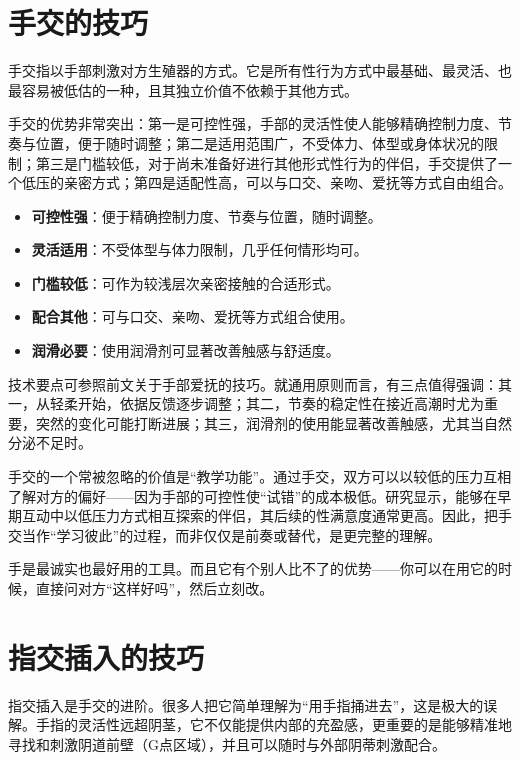 \documentclass[12pt,UTF8]{ctexbook}
\begin{document}
\section{手交的技巧}

手交指以手部刺激对方生殖器的方式。它是所有性行为方式中最基础、最灵活、也最容易被低估的一种，且其独立价值不依赖于其他方式。

手交的优势非常突出：第一是可控性强，手部的灵活性使人能够精确控制力度、节奏与位置，便于随时调整；第二是适用范围广，不受体力、体型或身体状况的限制；第三是门槛较低，对于尚未准备好进行其他形式性行为的伴侣，手交提供了一个低压的亲密方式；第四是适配性高，可以与口交、亲吻、爱抚等方式自由组合。

\begin{itemize}
\item \textbf{可控性强}：便于精确控制力度、节奏与位置，随时调整。
\item \textbf{灵活适用}：不受体型与体力限制，几乎任何情形均可。
\item \textbf{门槛较低}：可作为较浅层次亲密接触的合适形式。
\item \textbf{配合其他}：可与口交、亲吻、爱抚等方式组合使用。
\item \textbf{润滑必要}：使用润滑剂可显著改善触感与舒适度。
\end{itemize}

技术要点可参照前文关于手部爱抚的技巧。就通用原则而言，有三点值得强调：其一，从轻柔开始，依据反馈逐步调整；其二，节奏的稳定性在接近高潮时尤为重要，突然的变化可能打断进展；其三，润滑剂的使用能显著改善触感，尤其当自然分泌不足时。

手交的一个常被忽略的价值是“教学功能”。通过手交，双方可以以较低的压力互相了解对方的偏好——因为手部的可控性使“试错”的成本极低。研究显示，能够在早期互动中以低压力方式相互探索的伴侣，其后续的性满意度通常更高。因此，把手交当作“学习彼此”的过程，而非仅仅是前奏或替代，是更完整的理解。

\begin{tcolorbox}[colback=pink!5!white,colframe=red!50!black,title=贴心小叮咛]
手是最诚实也最好用的工具。而且它有个别人比不了的优势——你可以在用它的时候，直接问对方“这样好吗”，然后立刻改。
\end{tcolorbox}

\section{指交插入的技巧}

指交插入是手交的进阶。很多人把它简单理解为“用手指捅进去”，这是极大的误解。手指的灵活性远超阴茎，它不仅能提供内部的充盈感，更重要的是能够精准地寻找和刺激阴道前壁（G点区域），并且可以随时与外部阴蒂刺激配合。
\end{document}
